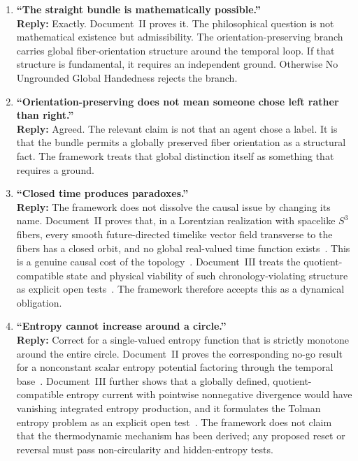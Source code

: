 \documentclass[11pt]{article}
\theoremstyle{canonstyle}
\begin{document}
\begin{enumerate}
    \item \textbf{``The straight bundle is mathematically possible.''} \\
    \textbf{Reply:} Exactly. Document~II proves it. The philosophical question is not mathematical existence but admissibility. The orientation-preserving branch carries global fiber-orientation structure around the temporal loop. If that structure is fundamental, it requires an independent ground. Otherwise No Ungrounded Global Handedness rejects the branch.

    \item \textbf{``Orientation-preserving does not mean someone chose left rather than right.''} \\
    \textbf{Reply:} Agreed. The relevant claim is not that an agent chose a label. It is that the bundle permits a globally preserved fiber orientation as a structural fact. The framework treats that global distinction itself as something that requires a ground.

    \item \textbf{``Closed time produces paradoxes.''} \\
    \textbf{Reply:} The framework does not dissolve the causal issue by changing its name. Document~II proves that, in a Lorentzian realization with spacelike $S^3$ fibers, every smooth future-directed timelike vector field transverse to the fibers has a closed orbit, and no global real-valued time function exists~\cite{CanonWhat}. This is a genuine causal cost of the topology~\cite{HawkingChronology}. Document~III treats the quotient-compatible state and physical viability of such chronology-violating structure as explicit open tests~\cite{CanonHow}. The framework therefore accepts this as a dynamical obligation.

    \item \textbf{``Entropy cannot increase around a circle.''} \\
    \textbf{Reply:} Correct for a single-valued entropy function that is strictly monotone around the entire circle. Document~II proves the corresponding no-go result for a nonconstant scalar entropy potential factoring through the temporal base~\cite{CanonWhat}. Document~III further shows that a globally defined, quotient-compatible entropy current with pointwise nonnegative divergence would have vanishing integrated entropy production, and it formulates the Tolman entropy problem as an explicit open test~\cite{CanonHow}. The framework does not claim that the thermodynamic mechanism has been derived; any proposed reset or reversal must pass non-circularity and hidden-entropy tests.
    

\end{enumerate}
\end{document}
